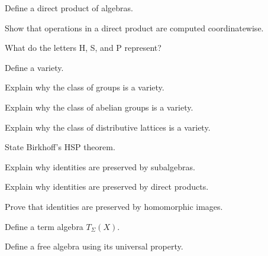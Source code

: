 \begin{exercise}[1]
Define a direct product of algebras.
\end{exercise}

\begin{exercise}[2]
Show that operations in a direct product are computed coordinatewise.
\end{exercise}

\begin{exercise}[1]
What do the letters H, S, and P represent?
\end{exercise}

\begin{exercise}[1]
Define a variety.
\end{exercise}

\begin{exercise}[2]
Explain why the class of groups is a variety.
\end{exercise}

\begin{exercise}[2]
Explain why the class of abelian groups is a variety.
\end{exercise}

\begin{exercise}[2]
Explain why the class of distributive lattices is a variety.
\end{exercise}

\begin{exercise}[2]
State Birkhoff's HSP theorem.
\end{exercise}

\begin{exercise}[2]
Explain why identities are preserved by subalgebras.
\end{exercise}

\begin{exercise}[2]
Explain why identities are preserved by direct products.
\end{exercise}

\begin{exercise}[3]
Prove that identities are preserved by homomorphic images.
\end{exercise}

\begin{exercise}[1]
Define a term algebra \(T_\Sigma(X)\).
\end{exercise}

\begin{exercise}[1]
Define a free algebra using its universal property.
\end{exercise}

